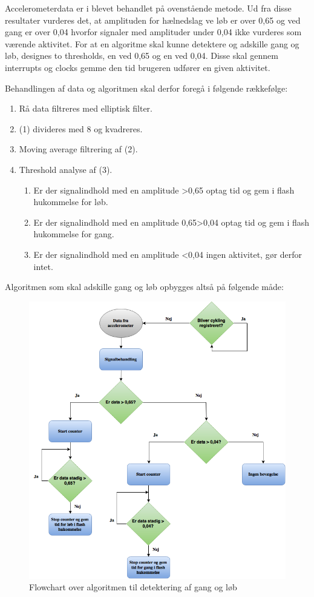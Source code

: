 Accelerometerdata er i  blevet behandlet på ovenstående metode. Ud fra disse resultater vurderes det, at amplituden for hælnedslag ve løb er over 0,65 og ved gang er over 0,04 hvorfor signaler med amplituder under 0,04 ikke vurderes som værende aktivitet. For at en algoritme skal kunne detektere og adskille gang og løb, designes to thresholds, en ved 0,65 og en ved 0,04. Disse skal gennem interrupts og clocks gemme den tid brugeren udfører en given aktivitet.

Behandlingen af data og algoritmen skal derfor foregå i følgende rækkefølge:
\begin{enumerate}
	\item Rå data filtreres med elliptisk filter.
	\item (1) divideres med 8 og kvadreres.
	\item Moving average filtrering af (2). 
	\item Threshold analyse af (3). 
	\begin{enumerate}
		\item Er der signalindhold med en amplitude >0,65 \textrightarrow optag tid og gem i flash hukommelse for løb.
		\item Er der signalindhold med en amplitude 0,65>0,04 \textrightarrow optag tid og gem i flash hukommelse for gang.
		\item Er der signalindhold med en amplitude <0,04 \textrightarrow ingen aktivitet, gør derfor intet.
	\end{enumerate}
\end{enumerate}

Algoritmen som skal adskille gang og løb opbygges altså på følgende måde:
\begin{figure}[H]
	\centering
	\includegraphics[scale=0.5]{figures/cDesign/algoritme_gl.png}
	\caption{Flowchart over algoritmen til detektering af gang og løb}
	\label{fig:algoritme}
\end{figure}



